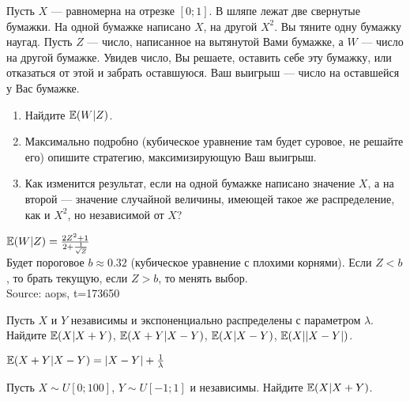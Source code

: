 \begin{problem}
Пусть $X$ — равномерна на отрезке $[0;1]$. В шляпе лежат две свернутые бумажки. На одной бумажке написано $X$, на другой $X^{2}$. Вы тяните одну бумажку наугад. Пусть $Z$ — число, написанное на вытянутой Вами бумажке, а $W$ — число на другой бумажке. Увидев число, Вы решаете, оставить себе эту бумажку, или отказаться от этой и забрать оставшуюся. Ваш выигрыш — число на оставшейся у Вас бумажке. \\

\begin{enumerate}
\item Найдите $\mathbb{E}(W|Z)$.
\item Максимально подробно (кубическое уравнение там будет суровое, не решайте его) опишите стратегию, максимизирующую Ваш выигрыш.
\item Как изменится результат, если на одной бумажке написано значение $X$, а на второй — значение случайной величины, имеющей такое же распределение, как и $X^{2}$, но независимой от $X$?
\end{enumerate}



\begin{sol}

$\mathbb{E}(W|Z)=\frac{2Z^{2}+1}{2+\frac{1}{\sqrt{Z}}}$ \\
Будет пороговое $b\approx 0.32$ (кубическое уравнение с плохими корнями). Если $Z<b$, то брать текущую, если $Z>b$, то менять выбор. \\
Source: aops, t=173650
\end{sol}
\end{problem}

\begin{problem}
Пусть $X$ и $Y$ независимы и экспоненциально распределены с параметром $\lambda$. \\
Найдите $\mathbb{E}(X|X+Y)$, $\mathbb{E}(X+Y|X-Y)$, $\mathbb{E}(X|X-Y)$, $\mathbb{E}(X||X-Y|)$.

\begin{sol}

 $\mathbb{E}(X+Y|X-Y)=|X-Y|+\frac{1}{\lambda}$
\end{sol}
\end{problem}

\begin{problem}
Пусть $X\sim U[0;100]$, $Y\sim U[-1;1]$ и независимы. Найдите $\mathbb{E}(X|X+Y)$.

\begin{sol}

\end{sol}
\end{problem}

